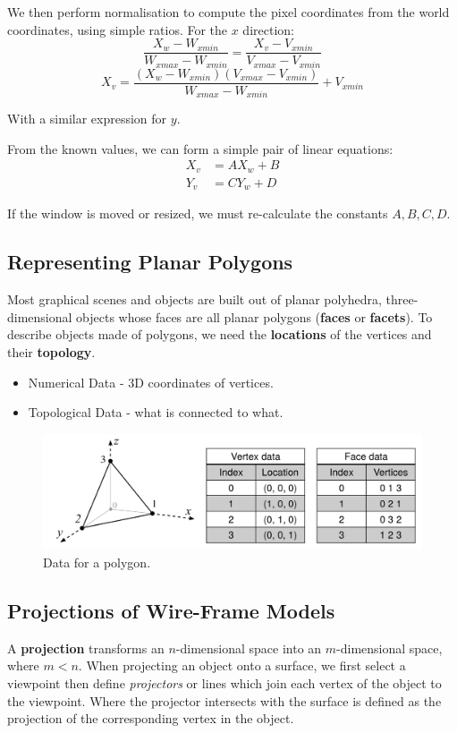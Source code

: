 \documentclass[11pt]{article}
\begin{document}
We then perform normalisation to compute the pixel coordinates from the world coordinates, using simple ratios.
For the $x$ direction:
\[
  \frac{X_w - W_{xmin}}{W_{xmax} - W_{xmin}} = \frac{X_v - V_{xmin}}{V_{xmax} - V_{xmin}}
\]
\[
  X_v = \frac{(X_w - W_{xmin})(V_{xmax} - V_{xmin})}{W_{xmax} - W_{xmin}} + V_{xmin}
\]

With a similar expression for $y$.

From the known values, we can form a simple pair of linear equations:
\begin{align*}
  X_v &= AX_w + B \\
  Y_v &= CY_w + D
\end{align*}

If the window is moved or resized, we must re-calculate the constants $A, B, C, D$.

\subsection{Representing Planar Polygons}
Most graphical scenes and objects are built out of planar polyhedra, three-dimensional objects whose faces are all planar polygons (\textbf{faces} or \textbf{facets}).
To describe objects made of polygons, we need the \textbf{locations} of the vertices and their \textbf{topology}.

\begin{itemize}
  \item Numerical Data - 3D coordinates of vertices.
  \item Topological Data - what is connected to what.
\end{itemize}

\begin{figure}[htb!]
  \caption{Data for a polygon.}
  \includegraphics[scale=0.3]{polygon}
  \centering
\end{figure}

\subsection{Projections of Wire-Frame Models}
A \textbf{projection} transforms an $n$-dimensional space into an $m$-dimensional space, where $m < n$.
When projecting an object onto a surface, we first select a viewpoint then define \textit{projectors} or lines which join each vertex of the object to the viewpoint.
Where the projector intersects with the surface is defined as the projection of the corresponding vertex in the object.
\end{document}
